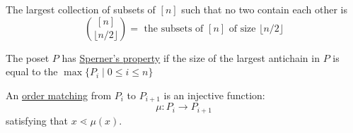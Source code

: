 \begin{theorem}
	The largest collection of subsets of \( [n] \) such that no two contain each other is
	\[
		\binom{[n]}{\lfloor n/2 \rfloor} = \text{ the subsets of }[n] \text{ of size } \lfloor n/2
		\rfloor
	\]
\end{theorem}

\begin{definition}
	The poset \( P \) has \underline{Sperner's property} if the size of the largest antichain in \( P
	\) is equal to the \( \max\{P_i \; | \; 0 \leq i \leq n\} \)
\end{definition}

\begin{definition}
	An \underline{order matching} from \( P_i \) to \( P_{i+1} \) is an injective function:
	\[
		\mu: P_i \to P_{i+1}
	\]
	satisfying that \( x \lessdot \mu(x) \).
\end{definition}

